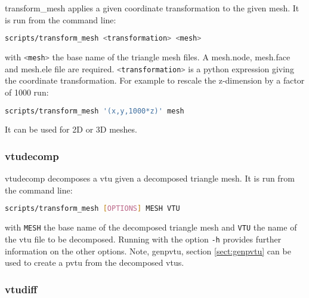 transform\_mesh applies a given coordinate transformation to the given mesh. It is run from the command line:
\begin{lstlisting}[language = Bash]
scripts/transform_mesh <transformation> <mesh>
\end{lstlisting}
with \lstinline[language = Bash]+<mesh>+ the base name of the triangle mesh files. A mesh.node, mesh.face and mesh.ele file are required. \lstinline[language = Bash]+<transformation>+ is a python expression giving the coordinate transformation. For example to rescale the z-dimension by a factor of 1000 run:
\begin{lstlisting}[language = Bash]
scripts/transform_mesh '(x,y,1000*z)' mesh
\end{lstlisting}
It can be used for 2D or 3D meshes.


\subsubsection{vtudecomp}
\label{sect:vtudecomp}

vtudecomp decomposes a vtu given a decomposed triangle mesh. It is run from the command line:
\begin{lstlisting}[language = Bash]
scripts/transform_mesh [OPTIONS] MESH VTU
\end{lstlisting}
with \lstinline[language = Bash]+MESH+ the base name of the decomposed triangle mesh and \lstinline[language = Bash]+VTU+ the name of the vtu file to be decomposed. Running with the option \lstinline[language = Bash]+-h+ provides further information on the other options. Note, genpvtu, section \ref{sect:genpvtu} can be used to create a pvtu from the decomposed vtus.


\subsubsection{vtudiff}
\label{sect:vtudiff}

